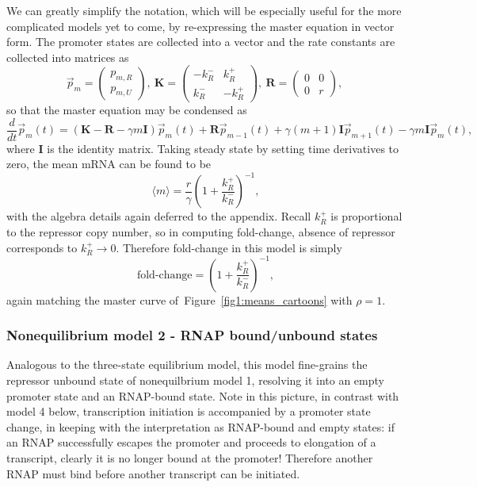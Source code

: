 \documentclass[12pt]{article}%
\newcommand{\vect}[1]{\vec{#1}}
\newcommand{\matr}[1]{\mathbf{#1}}
\newcommand{\deriv}[2][{}]{\frac{d #1}{d #2}}
\newcommand{\fig}[1]{Figure~\ref{#1}}
\begin{document}
We can greatly simplify the notation, which will be especially
useful for the more complicated models yet to come, by
re-expressing the master equation in vector form. The promoter
states are collected into a vector and the rate constants are
collected into matrices as
\begin{equation}
\vect{p}_m = \begin{pmatrix} p_{m,R} \\ p_{m,U} \end{pmatrix},\
\matr{K} = \begin{pmatrix} -k_R^- & k_R^+ \\ k_R^- & -k_R^+ \end{pmatrix},\
\matr{R} = \begin{pmatrix} 0 & 0 \\ 0 & r \end{pmatrix},\
\label{eq:2state_cme_matrices}
\end{equation}
so that the master equation may be condensed as
\begin{equation}
\deriv{t}\vect{p}_m(t) =
\left( \matr{K} - \matr{R} - \gamma m \matr{I} \right) \vect{p}_m(t)
                + \matr{R} \vect{p}_{m-1}(t)
                + \gamma (m+1) \matr{I} \vect{p}_{m+1}(t)
                - \gamma m \matr{I} \vect{p}_m(t),
\label{eq:2state_rep_cme}
\end{equation}
where $\matr{I}$ is the identity matrix.
Taking steady state by setting time derivatives to zero,
the mean mRNA can be found to be
\begin{equation}
\langle m \rangle = \frac{r}{\gamma}
        \left(1 + \frac{k_R^+}{k_R^-}\right)^{-1},
\end{equation}
with the algebra details again deferred to the appendix.
Recall $k_R^+$ is proportional to the repressor copy number, so
in computing fold-change, absence of repressor corresponds to
$k_R^+\rightarrow0$.
Therefore fold-change in this model is simply
\begin{equation}
\text{fold-change} = \left(1 + \frac{k_R^+}{k_R^-}\right)^{-1},
\end{equation}
again matching the master curve of~\fig{fig1:means_cartoons} with $\rho=1$.

\subsubsection{Nonequilibrium model 2 - RNAP bound/unbound states}
Analogous to the three-state equilibrium model, this model
fine-grains the repressor unbound state of nonequilbrium model 1,
resolving it into an empty promoter state and an RNAP-bound state.
Note in this picture, in contrast with model 4 below,
transcription initiation is accompanied by a promoter state
change, in keeping with the interpretation as RNAP-bound and
empty states: if an RNAP successfully escapes the promoter and
proceeds to elongation of a transcript, clearly it is no longer
bound at the promoter! Therefore another RNAP must bind before
another transcript can be initiated.
\end{document}
